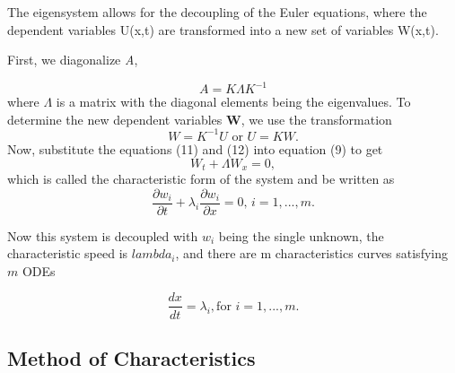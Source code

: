 \documentclass[]{article}
\begin{document}
	The eigensystem allows for the decoupling of the Euler equations, where the dependent variables U(x,t) are transformed into a new set of variables W(x,t). 
	
	First, we diagonalize \textit{A},
	
	\begin{equation}
		A = K \Lambda K^{-1}
	\end{equation}
	where $\Lambda$ is a matrix with the diagonal elements being the eigenvalues. To determine the new dependent variables \textbf{W}, we use the transformation
	\begin{equation}
		W = K^{-1} U  \mbox{ or }  U = KW.
	\end{equation}
	Now, substitute the equations (11) and (12) into equation (9) to get
	\begin{equation}
		W_t + \Lambda W_x = 0,
	\end{equation}
	which is called the characteristic form of the system and be written as 
	\begin{equation}
		\frac{\partial w_i}{\partial t} + \lambda_i \frac{\partial w_i}{\partial x} = 0 \mbox{,    } i = 1,...,m.
	\end{equation}

	Now this system is decoupled with $w_i$ being the single unknown, the characteristic speed is $lambda_i$, and there are m characteristics curves satisfying $m$ ODEs
	
	\begin{equation}
		\frac{dx}{dt} = \lambda_i, \mbox{for } i = 1,...,m.
	\end{equation}
	
	\subsection{Method of Characteristics}
	
\end{document}
